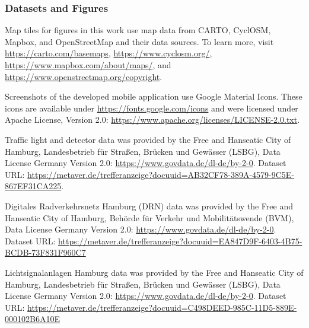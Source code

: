 \documentclass[
  ngerman,english, %
  fontsize=12pt,twoside,BCOR=6mm, %
  numbers=noenddot, %
  cd=fullcolor,
  open=right,
  headings=heavy,
  chapterpage=true,
  cdfont=off, %
  sfdefaults=false,
]{tudscrmanual}
\begin{document}

\subsubsection*{Datasets and Figures}

Map tiles for figures in this work use map data from CARTO, CyclOSM, Mapbox, and OpenStreetMap and their data sources. To learn more, visit \url{https://carto.com/basemaps}, \url{https://www.cyclosm.org/}, \url{https://www.mapbox.com/about/maps/}, and \url{https://www.openstreetmap.org/copyright}.

Screenshots of the developed mobile application use Google Material Icons. These icons are available under \url{https://fonts.google.com/icons} and were licensed under Apache License, Version 2.0: \url{https://www.apache.org/licenses/LICENSE-2.0.txt}.

Traffic light and detector data was provided by the Free and Hanseatic City of Hamburg, Landesbetrieb für Straßen, Brücken und Gewässer (LSBG), Data License Germany Version 2.0: \url{https://www.govdata.de/dl-de/by-2-0}. Dataset URL: \url{https://metaver.de/trefferanzeige?docuuid=AB32CF78-389A-4579-9C5E-867EF31CA225}.

Digitales Radverkehrsnetz Hamburg (DRN) data was provided by the Free and Hanseatic City of Hamburg, Behörde für Verkehr und Mobilitätswende (BVM), Data License Germany Version 2.0: \url{https://www.govdata.de/dl-de/by-2-0}. Dataset URL: \url{https://metaver.de/trefferanzeige?docuuid=EA847D9F-6403-4B75-BCDB-73F831F960C7}

Lichtsignalanlagen Hamburg data was provided by the Free and Hanseatic City of Hamburg, Landesbetrieb für Straßen, Brücken und Gewässer (LSBG), Data License Germany Version 2.0: \url{https://www.govdata.de/dl-de/by-2-0}. Dataset URL: \url{https://metaver.de/trefferanzeige?docuuid=C498DEED-985C-11D5-889E-000102B6A10E}
\end{document}
